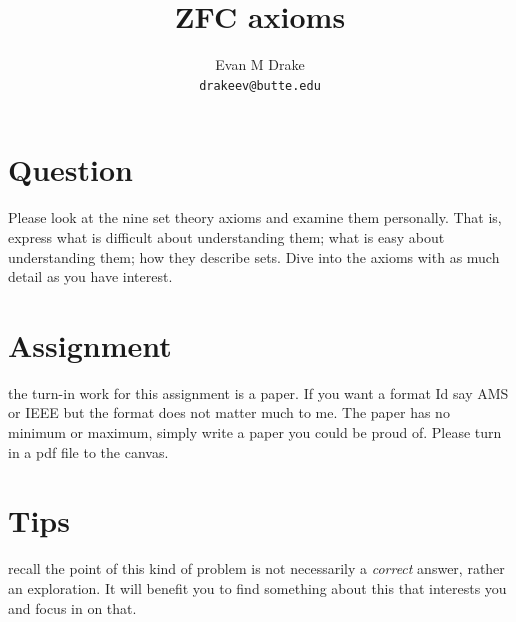 \documentclass[12pt]{article}
\title{ZFC axioms}
\author{
	Evan M Drake \\
	\texttt{drakeev@butte.edu}
}
\begin{document}
\maketitle


	\section*{Question}
		\indent Please look at the nine set theory axioms and examine them personally.
		That is, express what is difficult about understanding them;
			what is easy about understanding them;
			how they describe sets.
		Dive into the axioms with as much detail as you have interest.

	\section*{Assignment}
		\indent the turn-in work for this assignment is a paper.
		If you want a format Id say AMS or IEEE but the format does not matter much to me.
		The paper has no minimum or maximum, simply write a paper you could be proud of.
		Please turn in a pdf file to the canvas.

	\section*{Tips}
		\indent recall the point of this kind of problem is not necessarily a \textit{correct} answer,
			rather an exploration.
		It will benefit you to find something about this that interests you and focus in on that.
\end{document}

